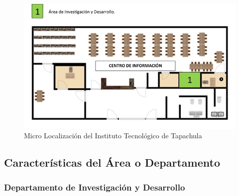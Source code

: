 \begin{figure}[!hb]
\centering
\includegraphics[scale=0.8]{sources/microlocalizacion.png}
\caption{Micro Localización del Instituto Tecnológico de Tapachula}\label{fig:microloc}
\end{figure}

\subsection*{Características del Área o Departamento}

\subsubsection*{Departamento de Investigación y Desarrollo}

